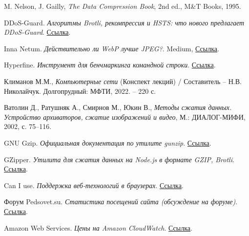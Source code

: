 \documentclass[12pt]{article}
\begin{document}
\begin{thebibliography}{9}
    M. Nelson, J. Gailly,
    \textit{The Data Compression Book},
    2nd ed., M\&T Books, 1995.

    DDoS-Guard.
    \textit{Алгоритмы Brotli, рекомпрессия и HSTS: что нового предлагает DDoS-Guard}.
    \href{https://ddos-guard.ru/blog/algoritmy-brotli-recompressiya-i-HSTS-chto-novogo-predlagaet-DDoS-GUARD}{Ссылка}.

    Inna Netum.
    \textit{Действительно ли WebP лучше JPEG?}.
    Medium, \href{https://medium.com/@inna_netum/действительно-ли-webp-лучше-jpeg-91639d852035}{Ссылка}.

    Hyperfine.
    \textit{Инструмент для бенчмаркинга командной строки}.
    \href{https://github.com/sharkdp/hyperfine}{Ссылка}.

    Климанов М.М.,
    \textit{Компьютерные сети} (Конспект лекций) / Составитель – Н.В. Николайчук.
    Долгопрудный: МФТИ, 2022. – 220 с.

    Ватолин Д., Ратушняк А., Смирнов М., Юкин В.,
    \textit{Методы сжатия данных. Устройство архиваторов, сжатие изображений и видео},
    М.: ДИАЛОГ-МИФИ, 2002, с. 75--116.
	
    GNU Gzip.
    \textit{Официальная документация по утилите gunzip}.
    \href{https://www.gnu.org/software/gzip/manual/gzip.html}{Ссылка}.

    GZipper.
    \textit{Утилита для сжатия данных на Node.js в формате GZIP, Brotli}.
    \href{https://www.npmjs.com/package/gzipper}{Ссылка}.

    Can I use.
    \textit{Поддержка веб-технологий в браузерах}.
    \href{https://caniuse.com/}{Ссылка}.

    Форум Pedsovet.su.
    \textit{Статистика посещений сайта (обсуждение на форуме)}.
    \href{https://pedsovet.su/forum/153-6531-3}{Ссылка}.

    Amazon Web Services.
    \textit{Цены на Amazon CloudWatch}.
    \href{https://aws.amazon.com/ru/cloudwatch/pricing/}{Ссылка}.
\end{thebibliography}
\end{document}
